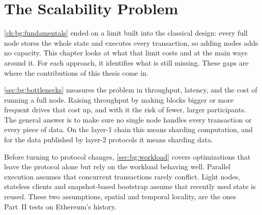 \chapter{The Scalability Problem}\label{ch:bg:scalability}


\autoref{ch:bg:fundamentals} ended on a limit built into the classical design: every full node stores the whole state and executes every transaction, so adding nodes adds no capacity.
This chapter looks at what that limit costs and at the main ways around it.
For each approach, it identifies what is still missing.
These gaps are where the contributions of this thesis come in.

\autoref{sec:bg:bottlenecks} measures the problem in throughput, latency, and the cost of running a full node.
Raising throughput by making blocks bigger or more frequent drives that cost up, and with it the risk of fewer, larger participants.
The general answer is to make sure no single node handles every transaction or every piece of data.
On the layer-1 chain this means sharding computation, and for the data published by layer-2 protocols it means sharding data.

Before turning to protocol changes, \autoref{sec:bg:workload} covers optimizations that leave the protocol alone but rely on the workload behaving well.
Parallel execution assumes that concurrent transactions rarely conflict.
Light nodes, stateless clients and snapshot-based bootstrap assume that recently used state is reused.
These two assumptions, spatial and temporal locality, are the ones Part~II tests on Ethereum's history.

